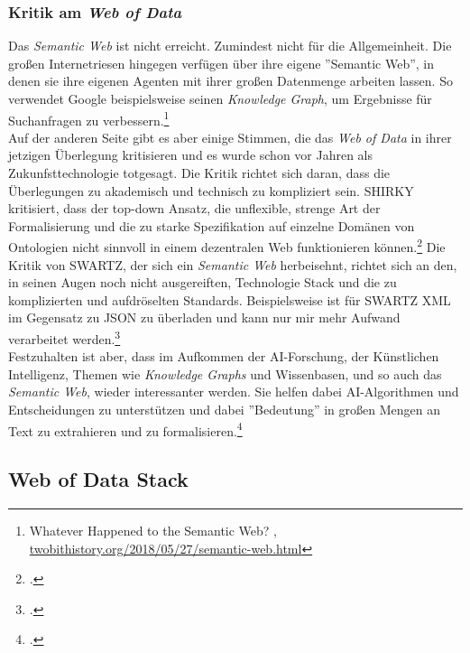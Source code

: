 \documentclass[12pt,a4paper]{article}
\begin{document}
\subsubsection{Kritik am \textit{Web of Data}}

Das \textit{Semantic Web} ist nicht erreicht. Zumindest nicht für die Allgemeinheit. Die großen Internetriesen hingegen verfügen über ihre eigene ''Semantic Web'', in denen sie ihre eigenen Agenten mit ihrer großen Datenmenge arbeiten lassen. So verwendet Google beispielsweise seinen \textit{Knowledge Graph}, um Ergebnisse für Suchanfragen zu verbessern.\footnote{Whatever Happened to the Semantic Web? , \url{twobithistory.org/2018/05/27/semantic-web.html}}
\\
Auf der anderen Seite gibt es aber einige Stimmen, die das \textit{Web of Data} in ihrer jetzigen Überlegung kritisieren und es wurde schon vor Jahren als Zukunfsttechnologie totgesagt. Die Kritik richtet sich daran, dass die Überlegungen zu akademisch und technisch zu kompliziert sein. SHIRKY kritisiert, dass der top-down Ansatz, die unflexible, strenge Art der Formalisierung und die zu starke Spezifikation auf einzelne Domänen von Ontologien nicht sinnvoll in einem dezentralen Web funktionieren können.\footcite{shirky2005ontology} Die Kritik von SWARTZ, der sich ein \textit{Semantic Web} herbeisehnt, richtet sich an den, in seinen Augen noch nicht ausgereiften, Technologie Stack und die zu komplizierten und aufdröselten Standards. Beispielsweise ist für SWARTZ XML im Gegensatz zu JSON zu überladen und kann nur mir mehr Aufwand verarbeitet werden.\footcite{swartz2013aaron}
\\
Festzuhalten ist aber, dass im Aufkommen der AI-Forschung, der Künstlichen Intelligenz, Themen wie \textit{Knowledge Graphs} und Wissenbasen, und so auch das \textit{Semantic Web}, wieder interessanter werden. Sie helfen dabei AI-Algorithmen und Entscheidungen zu unterstützen und dabei ''Bedeutung'' in großen Mengen an Text zu extrahieren und zu formalisieren.\footcite[][]{bernstein2016new}


\newpage
\subsection{Web of Data Stack}
\end{document}
